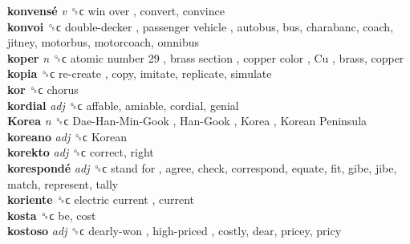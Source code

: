 \textbf{konvensé} \emph{v}  ␝ϲ   win over , convert, convince  \\
\textbf{konvoi} ␝ϲ   double-decker ,  passenger vehicle , autobus, bus, charabanc, coach, jitney, motorbus, motorcoach, omnibus  \\
\textbf{koper} \emph{n}  ␝ϲ   atomic number 29 ,  brass section ,  copper color ,  Cu , brass, copper  \\
\textbf{kopia} ␝ϲ   re-create , copy, imitate, replicate, simulate  \\
\textbf{kor} ␝ϲ  chorus  \\
\textbf{kordial} \emph{adj}  ␝ϲ  affable, amiable, cordial, genial  \\
\textbf{Korea} \emph{n}  ␝ϲ   Dae-Han-Min-Gook ,  Han-Gook ,  Korea ,  Korean Peninsula   \\
\textbf{koreano} \emph{adj}  ␝ϲ   Korean   \\
\textbf{korekto} \emph{adj}  ␝ϲ  correct, right  \\
\textbf{korespondé} \emph{adj}  ␝ϲ   stand for , agree, check, correspond, equate, fit, gibe, jibe, match, represent, tally  \\
\textbf{koriente} ␝ϲ   electric current , current  \\
\textbf{kosta} ␝ϲ  be, cost  \\
\textbf{kostoso} \emph{adj}  ␝ϲ   dearly-won ,  high-priced , costly, dear, pricey, pricy  \\
